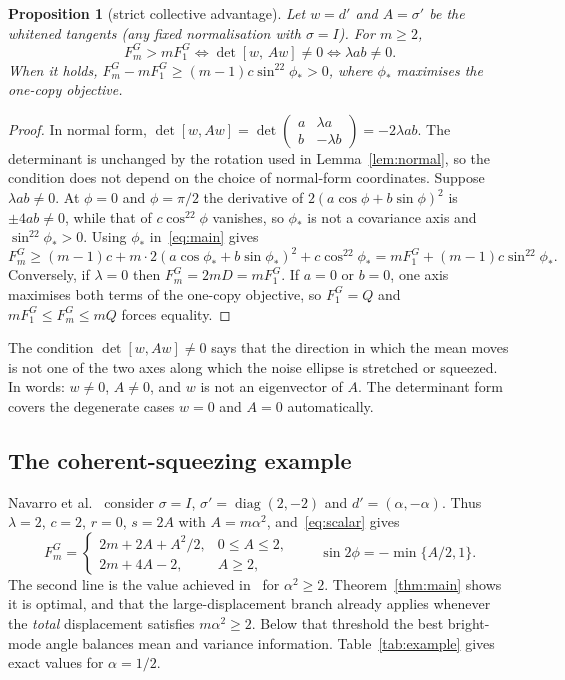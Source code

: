 \documentclass[11pt,a4paper]{article}
\newtheorem{proposition}{Proposition}
\theoremstyle{definition}\newtheorem{definition}{Definition}
\theoremstyle{remark}\newtheorem{remark}{Remark}
\newcommand{\diag}{\operatorname{diag}}
\begin{document}
\begin{proposition}[strict collective advantage]\label{prop:strict}
Let $w=d'$ and $A=\sigma'$ be the whitened tangents (any fixed normalisation with $\sigma=I$). For $m\ge2$,
\[
F_m^G>mF_1^G\iff\det[w,\,Aw]\ne0\iff\lambda ab\ne0 .
\]
When it holds, $F_m^G-mF_1^G\ge(m-1)c\sin^22\phi_*>0$, where $\phi_*$ maximises the one-copy objective.
\end{proposition}

\begin{proof}
In normal form, $\det[w,Aw]=\det\left(\begin{smallmatrix}a&\lambda a\\b&-\lambda b\end{smallmatrix}\right)=-2\lambda ab$. The determinant is unchanged by the rotation used in Lemma~\ref{lem:normal}, so the condition does not depend on the choice of normal-form coordinates. Suppose $\lambda ab\ne0$. At $\phi=0$ and $\phi=\pi/2$ the derivative of $2(a\cos\phi+b\sin\phi)^2$ is $\pm4ab\ne0$, while that of $c\cos^22\phi$ vanishes, so $\phi_*$ is not a covariance axis and $\sin^22\phi_*>0$. Using $\phi_*$ in~\eqref{eq:main} gives
\[
F_m^G\ge(m-1)c+m\cdot2(a\cos\phi_*+b\sin\phi_*)^2+c\cos^22\phi_*=mF_1^G+(m-1)c\sin^22\phi_* .
\]
Conversely, if $\lambda=0$ then $F_m^G=2mD=mF_1^G$. If $a=0$ or $b=0$, one axis maximises both terms of the one-copy objective, so $F_1^G=Q$ and $mF_1^G\le F_m^G\le mQ$ forces equality.
\end{proof}

The condition $\det[w,Aw]\ne0$ says that the direction in which the mean moves is not one of the two axes along which the noise ellipse is stretched or squeezed. In words: $w\ne0$, $A\ne0$, and $w$ is not an eigenvector of $A$. The determinant form covers the degenerate cases $w=0$ and $A=0$ automatically.

\subsection{The coherent-squeezing example}

Navarro et al.~\cite[Example~I]{Navarro2025} consider $\sigma=I$, $\sigma'=\diag(2,-2)$ and $d'=(\alpha,-\alpha)$. Thus $\lambda=2$, $c=2$, $r=0$, $s=2A$ with $A=m\alpha^2$, and~\eqref{eq:scalar} gives
\begin{equation}\label{eq:example}
F_m^G=\begin{cases}2m+2A+A^2/2,&0\le A\le2,\\ 2m+4A-2,&A\ge2,\end{cases}\qquad \sin2\phi=-\min\{A/2,1\}.
\end{equation}
The second line is the value achieved in~\cite{Navarro2025} for $\alpha^2\ge2$. Theorem~\ref{thm:main} shows it is optimal, and that the large-displacement branch already applies whenever the \emph{total} displacement satisfies $m\alpha^2\ge2$. Below that threshold the best bright-mode angle balances mean and variance information. Table~\ref{tab:example} gives exact values for $\alpha=1/2$.
\end{document}
